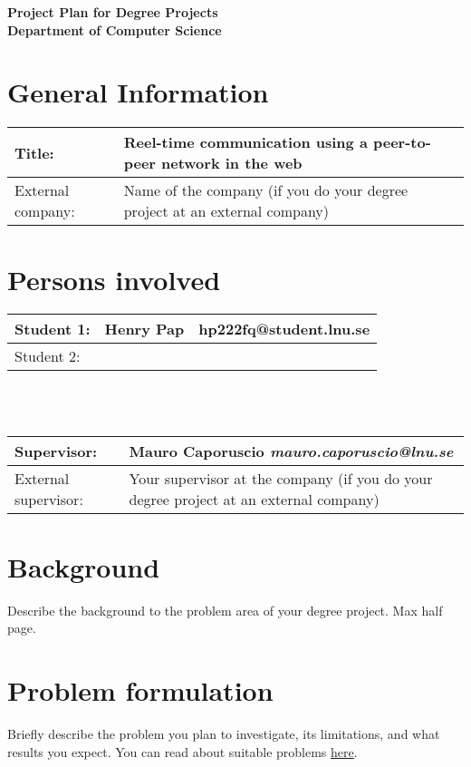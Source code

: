 \documentclass[12pt]{article}
\begin{document}
\begin{center}
\Large \textbf{Project Plan for Degree Projects} \\
\large \textbf{Department of Computer Science}
\end{center}

\section*{General Information}
\begin{tabular} {|p{3.8cm}|p{9cm}|} \hline
Title: & Reel-time communication using a peer-to-peer network in the web \\ \hline
External company: & Name of the company (if you do your degree project at an external company) \\ \hline
\end{tabular}

\section*{Persons involved}
\begin{tabular} {|p{2.2cm}|p{4.7cm}|p{5.47cm}|} \hline
Student 1: & Henry Pap & hp222fq@student.lnu.se \\ \hline
Student 2: &  &  \\ \hline
\end{tabular}
\\ \vspace*{0.2cm} \\
\begin{tabular} {|p{3.9cm}|p{8.9cm}|} \hline
Supervisor: & Mauro Caporuscio \textit{mauro.caporuscio@lnu.se} \\ \hline
External supervisor: & Your supervisor at the company (if you do your degree project at an external company) \\ \hline
\end{tabular}

\section*{Background}
Describe the background to the problem area of your degree project. Max half page.

\section*{Problem formulation}
Briefly describe the problem you plan to investigate, its limitations, and what results you expect. You can read about suitable problems \href{https://coursepress.lnu.se/subject/thesis-projects/problem/}{here}.
\end{document}
